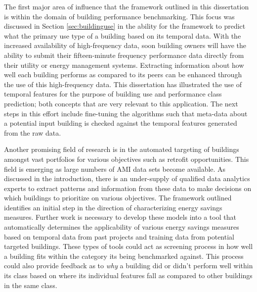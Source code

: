The first major area of influence that the framework outlined in this dissertation is within the domain of building performance benchmarking. This focus was discussed in Section \ref{sec:buildinguse} in the ability for the framework to predict what the primary use type of a building based on its temporal data. With the increased availability of high-frequency data, soon building owners will have the ability to submit their fifteen-minute frequency performance data directly from their utility or energy management systems. Extracting information about how well each building performs as compared to its peers can be enhanced through the use of this high-frequency data. This dissertation has illustrated the use of temporal features for the purpose of building use and performance class prediction; both concepts that are very relevant to this application. The next steps in this effort include fine-tuning the algorithms such that meta-data about a potential input building is checked against the temporal features generated from the raw data. 

Another promising field of research is in the automated targeting of buildings amongst vast portfolios for various objectives such as retrofit opportunities. This field is emerging as large numbers of AMI data sets become available. As discussed in the introduction, there is an under-supply of qualified data analytics experts to extract patterns and information from these data to make decisions on which buildings to prioritize on various objectives. The framework outlined identifies an initial step in the direction of characterizing energy savings measures. Further work is necessary to develop these models into a tool that automatically determines the applicability of various energy savings measures based on temporal data from past projects and training data from potential targeted buildings. These types of tools could act as screening process in how well a building fits within the category its being benchmarked against. This process could also provide feedback as to \emph{why} a building did or didn't perform well within its class based on where its individual features fall as compared to other buildings in the same class. 

